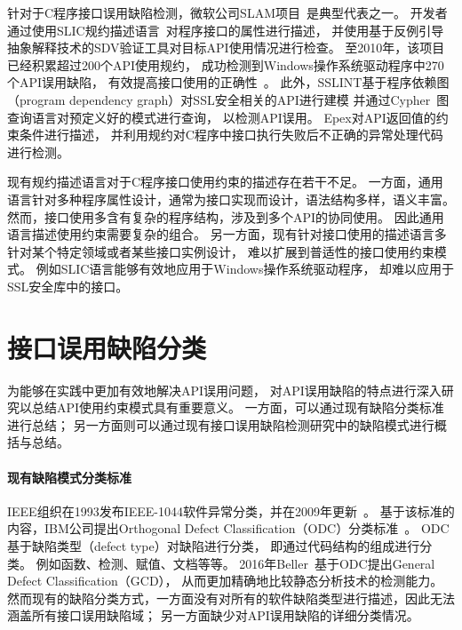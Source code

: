 针对于C程序接口误用缺陷检测，微软公司SLAM项目~\cite{slam}是典型代表之一。
开发者通过使用SLIC规约描述语言~\cite{01-slic}对程序接口的属性进行描述，
并使用基于反例引导抽象解释技术的SDV验证工具对目标API使用情况进行检查。
至2010年，该项目已经积累超过200个API使用规约，
成功检测到Windows操作系统驱动程序中270个API误用缺陷，
有效提高接口使用的正确性~\cite{10-cad-slam, 11-acm-slam}。
此外，SSLINT基于程序依赖图（program dependency graph）对SSL安全相关的API进行建模
并通过Cypher~\cite{18-sigmod-cypher}图查询语言对预定义好的模式进行查询，
以检测API误用。
Epex对API返回值的约束条件进行描述，
并利用规约对C程序中接口执行失败后不正确的异常处理代码进行检测。

现有规约描述语言对于C程序接口使用约束的描述存在若干不足。
一方面，通用语言针对多种程序属性设计，通常为接口实现而设计，语法结构多样，语义丰富。
然而，接口使用多含有复杂的程序结构，涉及到多个API的协同使用。
因此通用语言描述使用约束需要复杂的组合。
另一方面，现有针对接口使用的描述语言多针对某个特定领域或者某些接口实例设计，
难以扩展到普适性的接口使用约束模式。
例如SLIC语言能够有效地应用于Windows操作系统驱动程序，
却难以应用于SSL安全库中的接口。


\section{接口误用缺陷分类}
\label{sec:2.3}
为能够在实践中更加有效地解决API误用问题，
对API误用缺陷的特点进行深入研究以总结API使用约束模式具有重要意义。
一方面，可以通过现有缺陷分类标准进行总结；
另一方面则可以通过现有接口误用缺陷检测研究中的缺陷模式进行概括与总结。

\paragraph{现有缺陷模式分类标准}
IEEE组织在1993发布IEEE-1044软件异常分类，并在2009年更新~\cite{09-ieee-classification}。
基于该标准的内容，IBM公司提出Orthogonal Defect Classification（ODC）分类标准~\cite{92-tse-odc}。
ODC基于缺陷类型（defect type）对缺陷进行分类，
即通过代码结构的组成进行分类。
例如函数、检测、赋值、文档等等。
2016年Beller~\cite{16-saner-evaluation}基于ODC提出General Defect Classification（GCD），
从而更加精确地比较静态分析技术的检测能力。
然而现有的缺陷分类方式，一方面没有对所有的软件缺陷类型进行描述，因此无法涵盖所有接口误用缺陷域；
另一方面缺少对API误用缺陷的详细分类情况。

